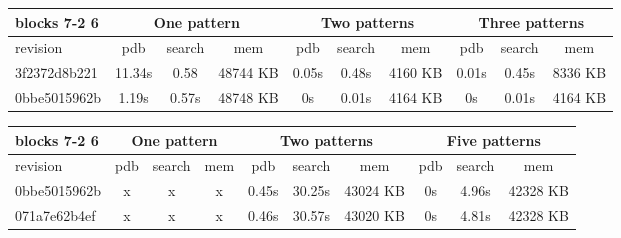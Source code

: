 \documentclass[a4paper,12pt]{scrartcl}
\begin{document}
\begin{tabular}{|l|c|c|c|c|c|c|c|c|c|}\hline
blocks 7-2 6 & \multicolumn{3}{c|}{One pattern} & \multicolumn{3}{c|}{Two patterns} & \multicolumn{3}{c|}{Three patterns}\\\hline
revision & pdb & search & mem & pdb & search & mem & pdb & search & mem\\\hline
3f2372d8b221 & 11.34s & 0.58 & 48744 KB & 0.05s & 0.48s & 4160 KB &  0.01s & 0.45s & 8336 KB\\\hline
0bbe5015962b & 1.19s & 0.57s & 48748 KB & 0s & 0.01s & 4164 KB & 0s & 0.01s & 4164 KB\\\hline
\end{tabular}

\begin{tabular}{|l|c|c|c|c|c|c|c|c|c|}\hline
blocks 7-2 6 & \multicolumn{3}{c|}{One pattern} & \multicolumn{3}{c|}{Two patterns} & \multicolumn{3}{c|}{Five patterns}\\\hline
revision & pdb & search & mem & pdb & search & mem & pdb & search & mem\\\hline
0bbe5015962b & x & x & x & 0.45s & 30.25s & 43024 KB & 0s & 4.96s & 42328 KB\\\hline
071a7e62b4ef & x & x & x & 0.46s & 30.57s & 43020 KB & 0s & 4.81s & 42328 KB\\\hline
\end{tabular}
\end{document}
